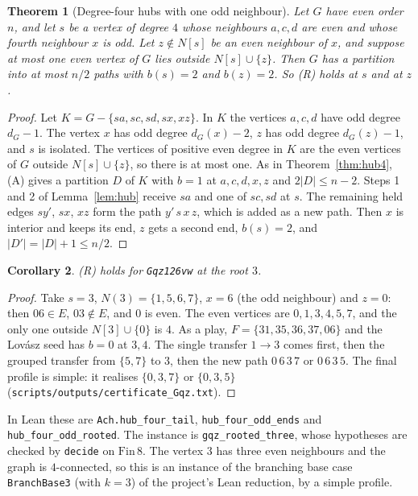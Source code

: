 \documentclass[11pt]{amsart}
\newtheorem{theorem}{Theorem}[section]
\newtheorem{corollary}[theorem]{Corollary}
\theoremstyle{definition}
\begin{document}
\begin{theorem}[Degree-four hubs with one odd neighbour]\label{thm:hub4odd}
Let $G$ have even order $n$, and let $s$ be a vertex of degree $4$ whose neighbours $a,c,d$ are
even and whose fourth neighbour $x$ is odd. Let $z\notin N[s]$ be an even neighbour of $x$, and
suppose at most one even vertex of $G$ lies outside $N[s]\cup\{z\}$. Then $G$ has a partition
into at most $n/2$ paths with $b(s)=2$ and $b(z)=2$. So (R) holds at $s$ and at $z$.
\end{theorem}
\begin{proof}
Let $K=G-\{sa,sc,sd,sx,xz\}$. In $K$ the vertices $a,c,d$ have odd degree $d_G-1$. The vertex
$x$ has odd degree $d_G(x)-2$, $z$ has odd degree $d_G(z)-1$, and $s$ is isolated. The vertices
of positive even degree in $K$ are the even vertices of $G$ outside $N[s]\cup\{z\}$, so there is
at most one. As in Theorem~\ref{thm:hub4}, (A) gives a partition $D$ of $K$ with $b=1$ at
$a,c,d,x,z$ and $2|D|\le n-2$. Steps 1 and 2 of Lemma~\ref{lem:hub} receive $sa$ and one of
$sc,sd$ at $s$. The remaining held edges $sy'$, $sx$, $xz$ form the path $y'\,s\,x\,z$, which is
added as a new path. Then $x$ is interior and keeps its end, $z$ gets a second end, $b(s)=2$, and
$|D'|=|D|+1\le n/2$.
\end{proof}

\begin{corollary}\label{cor:gqz}
(R) holds for \texttt{Gqz\char126vw} at the root $3$.
\end{corollary}
\begin{proof}
Take $s=3$, $N(3)=\{1,5,6,7\}$, $x=6$ (the odd neighbour) and $z=0$: then $06\in E$, $03\notin
E$, and $0$ is even. The even vertices are $0,1,3,4,5,7$, and the only one outside
$N[3]\cup\{0\}$ is $4$. As a play, $F=\{31,35,36,37,06\}$ and the Lov\'asz seed has $b=0$ at
$3,4$. The single transfer $1\to3$ comes first, then the grouped transfer from $\{5,7\}$ to $3$,
then the new path $0\,6\,3\,7$ or $0\,6\,3\,5$. The final profile is simple: it realises
$\{0,3,7\}$ or $\{0,3,5\}$ (\texttt{scripts/outputs/certificate\_Gqz.txt}).
\end{proof}
In Lean these are \texttt{Ach.hub\_four\_tail}, \texttt{hub\_four\_odd\_ends} and
\texttt{hub\_four\_odd\_rooted}. The instance is \texttt{gqz\_rooted\_three}, whose hypotheses
are checked by \texttt{decide} on $\mathrm{Fin}\,8$. The vertex $3$ has three even neighbours and
the graph is $4$-connected, so this is an instance of the branching base case
\texttt{BranchBase3} (with $k=3$) of the project's Lean reduction, by a simple profile.
\end{document}
